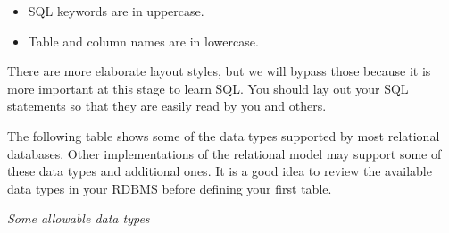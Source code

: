 \documentclass[
]{article}
\begin{document}
\begin{itemize}
\item
  SQL keywords are in uppercase.
\item
  Table and column names are in lowercase.
\end{itemize}

There are more elaborate layout styles, but we will bypass those because
it is more important at this stage to learn SQL. You should lay out your
SQL statements so that they are easily read by you and others.

The following table shows some of the data types supported by most
relational databases. Other implementations of the relational model may
support some of these data types and additional ones. It is a good idea
to review the available data types in your RDBMS before defining your
first table.

\emph{Some allowable data types}
\end{document}
